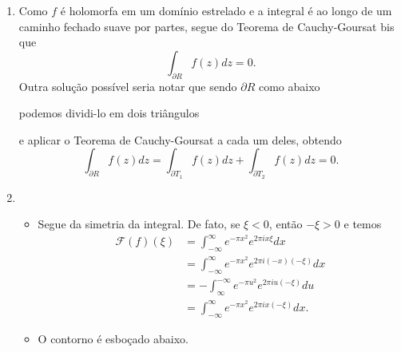 \documentclass[12pt,a4paper]{article}
\begin{document}
\begin{enumerate}
		\item Como $f$ é holomorfa em um domínio estrelado e a integral é ao longo de um caminho fechado suave por partes, segue do Teorema de Cauchy-Goursat bis que 
		$$
		\int_{\partial R}f(z)dz = 0.
		$$
		Outra solução possível seria notar que sendo $\partial R$ como abaixo		
		\begin{figure}[H]
			\centering
		\end{figure}
		podemos dividi-lo em dois triângulos
		\begin{figure}[H]
			\centering
		\end{figure}
	   e aplicar o Teorema de Cauchy-Goursat a cada um deles, obtendo
	   $$
	   \int_{\partial R}f(z)dz = \int_{\partial T_1}f(z)dz + \int_{\partial T_2}f(z)dz = 0.
	   $$
		
		\item\begin{itemize}
			\item Segue da simetria da integral. De fato, se $\xi<0$, então $-\xi>0$ e temos
			\begin{align*}
			\mathcal{F}(f)(\xi) &= \int_{-\infty}^{\infty}e^{-\pi x^2}e^{2\pi ix\xi}dx \\
			&= \int_{-\infty}^{\infty}e^{-\pi x^2}e^{2\pi i(-x)(-\xi)}dx \\
			&= -\int_{\infty}^{-\infty}e^{-\pi u^2}e^{2\pi iu(-\xi)}du \\
			&= \int_{-\infty}^{\infty}e^{-\pi x^2}e^{2\pi ix(-\xi)}dx.
			\end{align*}
			
			\item O contorno é esboçado abaixo. 
			\begin{figure}[H]
				\centering 
			\end{figure}
			

\end{itemize}
\end{enumerate}
\end{document}
